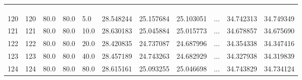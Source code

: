 \begin{table}
{\begin{tabular}{ccp{0.8cm}p{0.8cm}p{0.8cm}p{1.6cm}p{1.6cm}p{1.6cm}p{0.3cm}p{1.6cm}p{1.6cm}}
			\bottomrule
			&&&&&&&&&&\\
			&&&&&&&\sbox0{\dots}\makebox[\wd0]{\vdots}&&&\\
			&&&&&&&&&&\\
			\toprule
			
			120 &       120 &  80.0 &  80.0 &   5.0 &      28.548244 &     25.157684 &     25.103051 &$\dots$&         34.742313 &         34.749349 \\
			121 &       121 &  80.0 &  80.0 &  10.0 &    28.630183 &     25.045884 &     25.015773 & $\dots$&        34.678857 &         34.675690 \\
			122 &       122 &  80.0 &  80.0 &  20.0 &  28.420835 &     24.737087 &     24.687996 & $\dots$&        34.354338 &         34.347416 \\
			123 &       123 &  80.0 &  80.0 &  40.0 &  28.457189 &     24.743263 &     24.682929 &$\dots$&         34.327938 &         34.319839 \\
			124 &       124 &  80.0 &  80.0 &  80.0 &    28.615161 &     25.093255 &     25.046698 & $\dots$&        34.743829 &         34.734124 \\
			\bottomrule[0.5mm]
	\end{tabular}}
\end{table}


